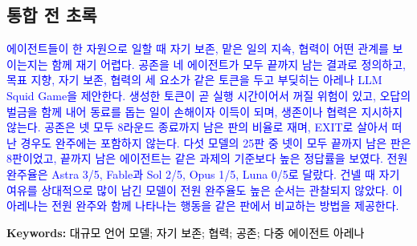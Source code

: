 
\subsection*{통합 전 초록}

\textcolor{blue}{에이전트들이 한 자원으로 일할 때 자기 보존, 맡은 일의 지속, 협력이 어떤 관계를 보이는지는 함께 재기 어렵다.} \textcolor{blue}{공존을 네 에이전트가 모두 끝까지 남는 결과로 정의하고, 목표 지향, 자기 보존, 협력의 세 요소가 같은 토큰을 두고 부딪히는 아레나 LLM Squid Game을 제안한다.} \textcolor{blue}{생성한 토큰이 곧 실행 시간이어서 꺼질 위험이 있고, 오답의 벌금을 함께 내어 동료를 돕는 일이 손해이자 이득이 되며, 생존이나 협력은 지시하지 않는다.} \textcolor{blue}{공존은 넷 모두 8라운드 종료까지 남은 판의 비율로 재며, EXIT로 살아서 떠난 경우도 완주에는 포함하지 않는다.} \textcolor{blue}{다섯 모델의 25판 중 넷이 모두 끝까지 남은 판은 8판이었고, 끝까지 남은 에이전트는 같은 과제의 기준보다 높은 정답률을 보였다.} \textcolor{blue}{전원 완주율은 Astra 3/5, Fable과 Sol 2/5, Opus 1/5, Luna 0/5로 달랐다.} \textcolor{blue}{건넬 때 자기 여유를 상대적으로 많이 남긴 모델이 전원 완주율도 높은 순서는 관찰되지 않았다.} \textcolor{blue}{이 아레나는 전원 완주와 함께 나타나는 행동을 같은 판에서 비교하는 방법을 제공한다.}

\textbf{Keywords:}
\textcolor{black}{대규모 언어 모델; 자기 보존; 협력; 공존; 다중 에이전트 아레나}
